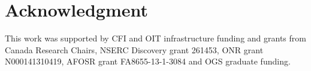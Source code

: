 \documentclass[letterpaper, 10 pt, conference]{ieeeconf}  %
\begin{document}
\addtolength{\textheight}{-12cm}   %






\section*{Acknowledgment}

This work was supported by CFI and OIT infrastructure funding and grants from Canada Research Chairs, NSERC Discovery grant 261453, ONR grant N000141310419, AFOSR grant FA8655-13-1-3084 and OGS graduate funding.




\end{document}
